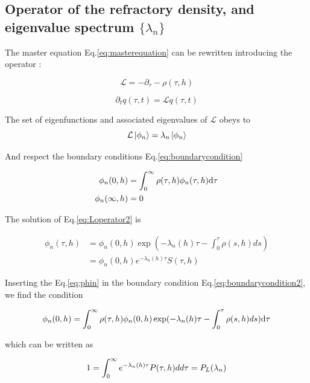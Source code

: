 \documentclass[a4paper,11pt,twoside]{article}
\def \dd  {{\rm d}}
\numberwithin{equation}{section}
\begin{document}
\subsection{Operator of the refractory density, and eigenvalue spectrum $\{\lambda_n\}$}

The master equation Eq.\eqref{eq:masterequation} can be rewritten introducing the operator :

\begin{equation}
\label{eq:Loperator}
\mathcal{L}=-\partial_\tau-\rho(\tau,h)
\end{equation}

\begin{equation}
\label{eq:masterequation2}
\partial_t q(\tau,t)=\mathcal{L}q(\tau,t)
\end{equation}

The set of eigenfunctions and associated eigenvalues of $\mathcal{L}$ obeys to
\begin{equation}
\label{eq:Loperator2}
\mathcal{L}\ket{\phi_n}=\lambda_n\ket{\phi_n}
\end{equation}

And respect the boundary conditions Eq.\eqref{eq:boundarycondition}

\begin{align}
\label{eq:boundarycondition2}
\phi_n(0,h)&=\int_0^\infty\rho(\tau,h)\phi_n(\tau,h)\dd\tau\\
\phi_n(\infty,h)&=0\\
\end{align}

The solution of Eq.\eqref{eq:Loperator2} is

\begin{align}
\label{eq:phin}
\phi_n(\tau,h)&=\phi_n(0,h)\exp(-\lambda_n(h)\tau-\int_0^\tau\rho(s,h)ds)\nonumber\\
&=\phi_n(0,h)e^{-\lambda_n(h)\tau}S(\tau,h)
\end{align}

Inserting the Eq.\eqref{eq:phin} in the boundary condition Eq.\eqref{eq:boundarycondition2}, we find the condition

\begin{equation}
\label{eq:condition1}
\phi_n(0,h)=\int_0^\infty\rho(\tau,h)\phi_n(0,h)\exp(-\lambda_n(h)\tau-\int_0^\tau\rho(s,h)ds)\dd\tau
\end{equation}

which can be written as

\begin{equation}
\label{eq:condition2}
1=\int_0^\infty e^{-\lambda_n(h) \tau}P(\tau,h)dd\tau=P_L(\lambda_n)\\
\end{equation}
\end{document}
